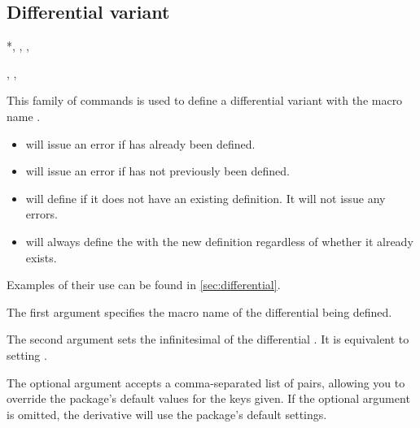 \subsection{Differential variant} \label{ssec:defvar_inf}

\begin{function}*{\NewDifferential, \RenewDifferential, \ProvideDifferential, \DeclareDifferential}
	\begin{syntax}
		, , 
	\end{syntax}
	This family of commands is used to define a differential variant with the macro name . %
	
	\begin{itemize}
		\item {} will issue an error if  has already been defined.
		\item {} will issue an error if  has not previously been defined.
		\item {} will define  if it does not have an existing definition. It will not issue any errors.
		\item {} will always define the  with the new definition regardless of whether it already exists.
	\end{itemize}
	Examples of their use can be found in \cref{sec:differential}.
	
	\begin{argument}{1}
		The first argument specifies the macro name of the differential being defined.
	\end{argument}
	
	\begin{argument}{2}
		The second argument sets the infinitesimal of the differential . It is equivalent to setting .
	\end{argument}
	
	\begin{argument}{3}
		The optional argument accepts a comma-separated list of  pairs, allowing you to override the package's default values for the keys given. If the optional argument is omitted, the derivative will use the package's default settings.
	\end{argument}
\end{function}


